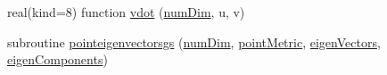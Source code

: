 \begin{DoxyCompactItemize}
\item 
real(kind=8) function \hyperlink{namespacemetricops_a2ad1b3b390a1df3e16e258eb2bf0d37a}{vdot} (\hyperlink{SATKernels_8H_a680185db8546de161968dabace9e94f1}{num\+Dim}, u, v)
\item 
subroutine \hyperlink{namespacemetricops_a6cac925729827357652e938b64681663}{pointeigenvectorsgs} (\hyperlink{SATKernels_8H_a680185db8546de161968dabace9e94f1}{num\+Dim}, \hyperlink{RoeKernels_8H_a3ef779535ff22c94cec7a43794047e9d}{point\+Metric}, \hyperlink{MetricKernels_8H_afb43d750e3a6b4c1549a9589c0f2a7d6}{eigen\+Vectors}, \hyperlink{MetricKernels_8H_ad7c998cbde26ccedfe008bbb660d59fe}{eigen\+Components})
\end{DoxyCompactItemize}
